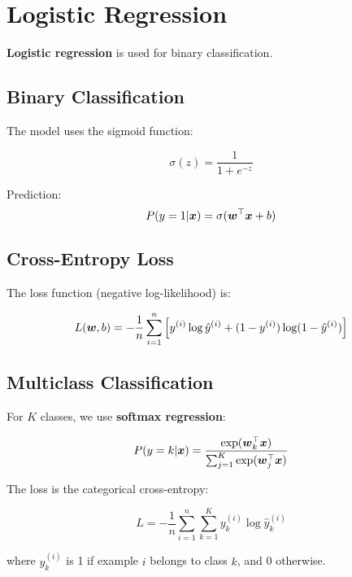 
\section{Logistic Regression}
\label{sec:logistic-regression}

\textbf{Logistic regression} is used for binary classification.

\subsection{Binary Classification}

The model uses the sigmoid function:

\begin{equation}
\sigma(z) = \frac{1}{1 + e^{-z}}
\end{equation}

Prediction:
\begin{equation}
P(y=1|\boldsymbol{x}) = \sigma(\boldsymbol{w}^\top \boldsymbol{x} + b)
\end{equation}

\subsection{Cross-Entropy Loss}

The loss function (negative log-likelihood) is:

\begin{equation}
L(\boldsymbol{w}, b) = -\frac{1}{n} \sum_{i=1}^{n} \left[y^{(i)} \log \hat{y}^{(i)} + (1-y^{(i)}) \log(1-\hat{y}^{(i)})\right]
\end{equation}

\subsection{Multiclass Classification}

For $K$ classes, we use \textbf{softmax regression}:

\begin{equation}
P(y=k|\boldsymbol{x}) = \frac{\exp(\boldsymbol{w}_k^\top \boldsymbol{x})}{\sum_{j=1}^{K} \exp(\boldsymbol{w}_j^\top \boldsymbol{x})}
\end{equation}

The loss is the categorical cross-entropy:

\begin{equation}
L = -\frac{1}{n} \sum_{i=1}^{n} \sum_{k=1}^{K} y_k^{(i)} \log \hat{y}_k^{(i)}
\end{equation}

where $y_k^{(i)}$ is 1 if example $i$ belongs to class $k$, and 0 otherwise.

